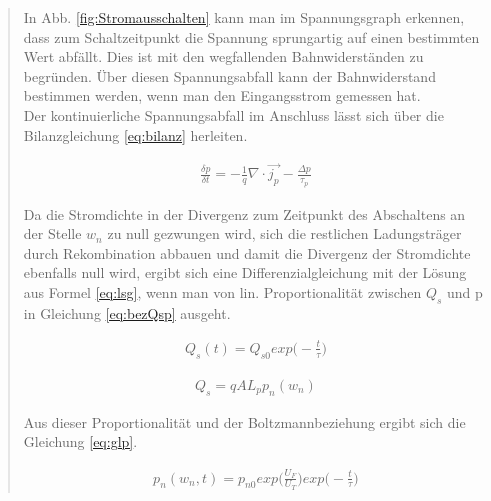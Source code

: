 \begin{quote}
    \vspace{2em}

    In Abb. \ref{fig:Stromausschalten} kann man im Spannungsgraph erkennen,
    dass zum Schaltzeitpunkt die Spannung sprungartig auf einen bestimmten Wert
    abfällt. Dies ist mit den wegfallenden Bahnwiderständen zu begründen. Über
    diesen Spannungsabfall kann der Bahnwiderstand bestimmen werden, wenn
    man den Eingangsstrom gemessen hat.\\
	Der kontinuierliche Spannungsabfall im Anschluss lässt sich über die
	Bilanzgleichung \ref{eq:bilanz} herleiten.

	\begin{equation}
         \begin{split}
             \frac{\delta p}{\delta t}=-\frac{1}{q}\nabla \cdot \vec{j_{p}}-\frac{\Delta p}{\tau_{p}}
         \end{split}
         \label{eq:bilanz}
    \end{equation}

    Da die Stromdichte in der Divergenz zum Zeitpunkt des Abschaltens an der
    Stelle $w_{n}$ zu null gezwungen wird, sich die restlichen Ladungsträger
    durch Rekombination abbauen und damit die Divergenz der Stromdichte
    ebenfalls null wird, ergibt sich eine Differenzialgleichung mit der Lösung
    aus Formel \ref{eq:lsg}, wenn man von lin. Proportionalität zwischen $Q_{s}$
    und p in Gleichung \ref{eq:bezQsp} ausgeht.

    \begin{equation}
         \begin{split}
             Q_{s}(t)=Q_{s0}exp\Big(-\frac{t}{\tau}\Big)
         \end{split}
         \label{eq:lsg}
    \end{equation}

    \begin{equation}
         \begin{split}
             Q_{s}=qAL_{p}p_{n}(w_{n})
         \end{split}
         \label{eq:bezQsp}
    \end{equation}

	Aus dieser Proportionalität und der Boltzmannbeziehung ergibt sich die
	Gleichung \ref{eq:glp}.

	\begin{equation}
         \begin{split}
             p_{n}(w_{n},t)=p_{n0}exp\Big(\frac{U_{F}}{U_{T}}\Big)exp\Big(-\frac{t}{\tau}\Big)
         \end{split}
         \label{eq:glp}
    \end{equation}


\end{quote}
